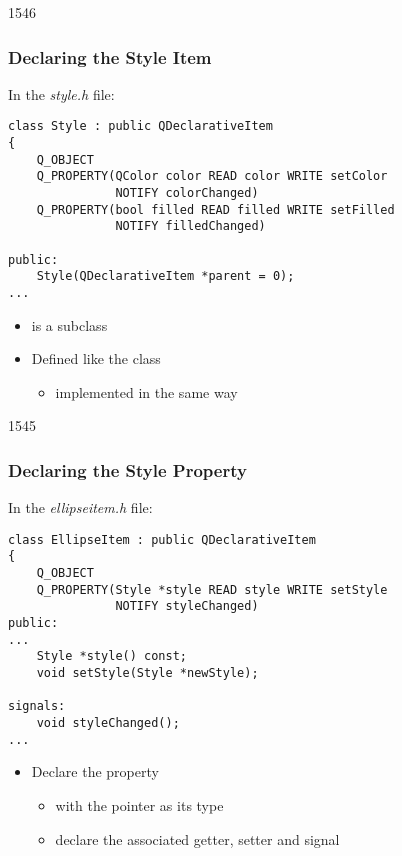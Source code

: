 \begin{slide}[fragile]{1546}\frametitle{Declaring the Style Item}

In the \textit{style.h} file:

\vspace*{0.5em}
\begin{lstlisting}
class Style : public QDeclarativeItem
{
    Q_OBJECT
    Q_PROPERTY(QColor color READ color WRITE setColor
               NOTIFY colorChanged)
    Q_PROPERTY(bool filled READ filled WRITE setFilled
               NOTIFY filledChanged)

public:
    Style(QDeclarativeItem *parent = 0);
...
\end{lstlisting}

\begin{itemize}
\item {} is a  subclass
\item Defined like the  class
  \begin{itemize}
  \item implemented in the same way
  \end{itemize}
\end{itemize}

\end{slide}

\begin{slide}[fragile]{1545}\frametitle{Declaring the Style Property}

In the \textit{ellipseitem.h} file:

\vspace*{0.25em}
\begin{lstlisting}
class EllipseItem : public QDeclarativeItem
{
    Q_OBJECT
    Q_PROPERTY(Style *style READ style WRITE setStyle
               NOTIFY styleChanged)
public:
...
    Style *style() const;
    void setStyle(Style *newStyle);

signals:
    void styleChanged();
...
\end{lstlisting}

\begin{itemize}
\item Declare the  property
  \begin{itemize}
  \item with the  pointer as its type
  \item declare the associated getter, setter and signal
  \end{itemize}
\end{itemize}

\end{slide}

